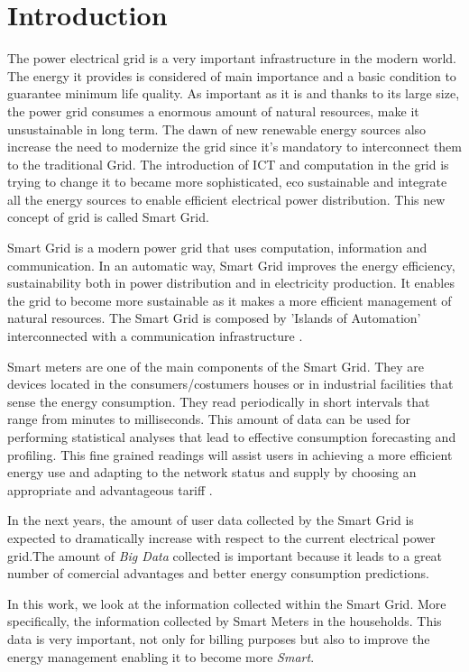 \chapter{Introduction}\label{c:intro}
The power electrical grid is a very important infrastructure in the modern world. The energy it provides is considered of main importance and a basic condition to guarantee minimum life quality. As important as it is and thanks to its large size, the power grid consumes a enormous amount of natural resources, make it unsustainable in long term. The dawn of new renewable energy sources also increase the need to modernize the grid since it's mandatory to interconnect them to the traditional Grid. The introduction of ICT and computation in the grid is trying to change it to became more sophisticated, eco sustainable and integrate all the energy sources to enable efficient electrical power distribution. This new concept of grid is called Smart Grid.

Smart Grid is a modern power grid that uses computation, information and communication. In an automatic way, Smart Grid improves the energy efficiency, sustainability both in power distribution and in electricity production. It enables the grid to become more sustainable as it makes a more efficient management of  natural resources. The Smart Grid is composed by 'Islands of Automation' interconnected with a communication infrastructure \cite{Ericsson_2}. 

Smart meters are one of the main components of the Smart Grid. They are devices located in the consumers/costumers houses or in industrial facilities that sense the energy consumption. They  read periodically in short intervals that range from minutes to milliseconds. This amount of data can be used for performing statistical analyses that lead to effective consumption forecasting and profiling. This fine grained readings will assist users in achieving a more efficient energy use and adapting to the network status and supply by choosing an appropriate and advantageous tariff \cite{journals/spm/ErkinTLP13}.

In the next years, the amount of user data collected by the Smart Grid is expected to dramatically increase with respect to the current electrical power grid.The amount of \textit{Big Data} collected is important because it leads to a great number of comercial advantages and better energy consumption predictions\cite{INDIN2013aggregationPerformance}.

In this work, we look at the information collected within the Smart Grid. More specifically, the information collected by Smart Meters in the households. This data is very important, not only for billing purposes but also to improve the energy management enabling it to become more \textit{Smart}.  


